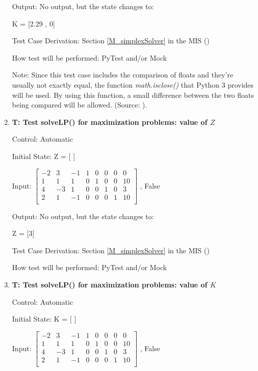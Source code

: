 \documentclass[12pt, titlepage]{article}
\newcounter{testnum} %
\begin{document}
\begin{enumerate}
	Output: No output, but the state changes to:
	
	K = [2.29 , 0]
	
	Test Case Derivation: Section \ref{M_simplexSolver} in the MIS 
	(\cite{losms-mis})
	
	How test will be performed: PyTest and/or Mock
	
	Note: Since this test case includes the comparison of floats and they're 
	usually not exactly equal, the function \textit{math.isclose()} that Python 
	3 provides will be used. By using this function, a small difference between 
	the two floats being compared will be allowed. (Source: \cite{python3-doc}).
	
	\item{\textbf{T\thetestnum \label{solveLpMaxZ}: 
	Test solveLP() for maximization problems: value of $Z$}}
	
	Control: Automatic
	
	Initial State: Z = [ ]
	
	Input: 	$\begin{bmatrix}
	-2 & 3 & -1 & 1 & 0 & 0 & 0 & 0\\
	1 & 1 & 1 & 0 & 1 & 0 & 0 & 10\\
	4 & -3 & 1 & 0 & 0 & 1 & 0 & 3\\
	2 & 1 & -1 & 0 & 0 & 0 & 1 & 10\\
	\end{bmatrix}$ , False 
	
	Output: No output, but the state changes to:
	
	Z = [3]
	
	Test Case Derivation: Section \ref{M_simplexSolver} in the MIS 
	(\cite{losms-mis})
	
	How test will be performed: PyTest and/or Mock
	
	\item{\textbf{T\thetestnum \label{solveLpMaxK}: 
	Test solveLP() for maximization problems: value of $K$}}
	
	Control: Automatic
	
	Initial State: K = [ ]
	
	Input: 	$\begin{bmatrix}
	-2 & 3 & -1 & 1 & 0 & 0 & 0 & 0\\
	1 & 1 & 1 & 0 & 1 & 0 & 0 & 10\\
	4 & -3 & 1 & 0 & 0 & 1 & 0 & 3\\
	2 & 1 & -1 & 0 & 0 & 0 & 1 & 10\\
	\end{bmatrix}$ , False 
	

\end{enumerate}
\end{document}
